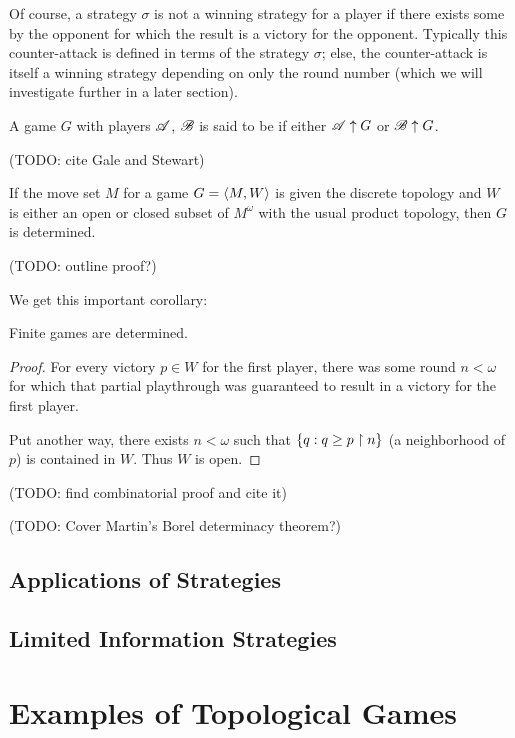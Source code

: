 Of course, a strategy $\sigma$ is not a winning strategy for a player if there 
exists some  by the opponent for which the result is 
a victory for the opponent. Typically this counter-attack is defined in
terms of the strategy $\sigma$; else, the counter-attack is itself a
winning strategy depending on only the round number (which we will
investigate further in a later section).

\begin{defn}
  A game $G$ with players $\mathscr{A}$, $\mathscr{B}$ is said to be 
  if either $\mathscr{A} \uparrow G$ or $\mathscr{B} \uparrow G$.
\end{defn}

(TODO: cite Gale and Stewart)

\begin{thm}
  If the move set $M$ for a game $G=\langle M,W\rangle$ is given the discrete topology
  and $W$ is either an open or closed subset of $M^\omega$ with the
  usual product topology, then $G$ is determined.
\end{thm}

(TODO: outline proof?)

We get this important corollary:

\begin{cor}
  Finite games are determined.
\end{cor}

\begin{proof} 
  For every victory $p\in W$ for the first player, there was some 
  round $n<\omega$ for which that partial playthrough was guaranteed to
  result in a victory for the first player. 

  Put another way, there exists $n<\omega$ such that
    $ 
      \{q : q\geq p\restriction n \}
    $
  (a neighborhood of $p$) is contained in $W$. Thus $W$ is open.
\end{proof}

(TODO: find combinatorial proof and cite it)

(TODO: Cover Martin's Borel determinacy theorem?)

\subsection{Applications of Strategies}

\subsection{Limited Information Strategies}


\section{Examples of Topological Games}